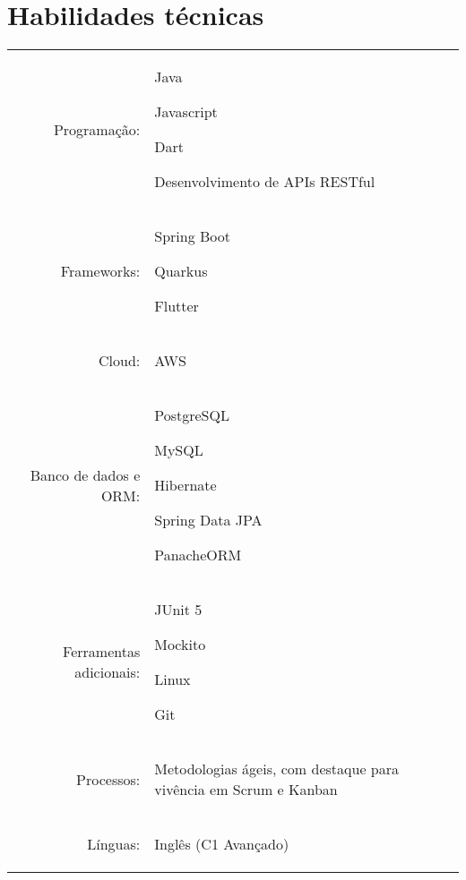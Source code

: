 \documentclass[a4paper,12pt]{article}
\newcommand{\preheadingspacing}{\vspace{6pt}}
\newcommand{\postheadingspacing}{\vspace{6pt}}
\begin{document}
\preheadingspacing
\section{Habilidades técnicas}
\postheadingspacing
\begin{tabular}{rp{15.2cm}}
\raggedleft Programação:
& \begin{itemize*}[label=\Large\textbullet]
    \item Java
    \item Javascript
    \item Dart
    \item Desenvolvimento de APIs RESTful
\end{itemize*}\\
\raggedleft Frameworks:
& \begin{itemize*}[label=\Large\textbullet]
    \item Spring Boot
    \item Quarkus
    \item Flutter
\end{itemize*}\\
\raggedleft Cloud:
& \begin{itemize*}[label=\Large\textbullet]
    \item AWS
\end{itemize*}\\
\raggedleft Banco de dados e ORM:
& \begin{itemize*}[label=\Large\textbullet]
    \item PostgreSQL
    \item MySQL
    \item Hibernate
    \item Spring Data JPA
    \item PanacheORM
\end{itemize*}\\
\raggedleft Ferramentas adicionais:
& \begin{itemize*}[label=\Large\textbullet]
    \item JUnit 5
    \item Mockito
    \item Linux
    \item Git
\end{itemize*}\\
\raggedleft Processos:
& \begin{itemize*}[label=\Large\textbullet]
    \item Metodologias ágeis, com destaque para vivência em Scrum e Kanban
\end{itemize*}\\
\raggedleft Línguas:
& \begin{itemize*}[label=\Large\textbullet]
    \item Inglês (C1 Avançado)
\end{itemize*}\\
\end{tabular}
\end{document}
